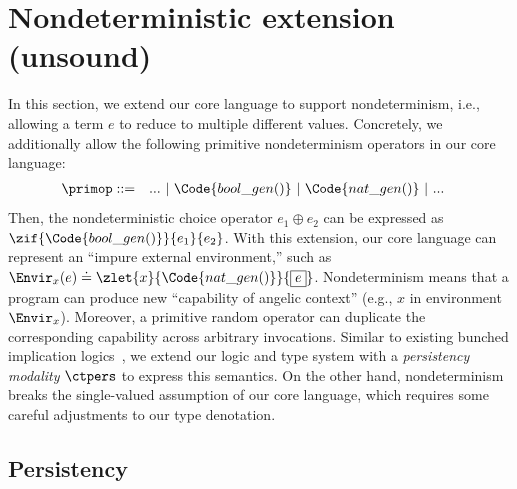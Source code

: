 \section{Nondeterministic extension (unsound)}\label{sec:extension}

In this section, we extend our core language to support nondeterminism, i.e., allowing a term $e$ to reduce to multiple different values. Concretely, we additionally allow the following primitive nondeterminism operators in our core language:
\begin{align*}
  \primop ::= \quad & ... ~|~ \Code{bool\_gen()} ~|~ \Code{nat\_gen()} ~|~ ...
\end{align*}\noindent
Then, the nondeterministic choice operator $e_1 \oplus e_2$ can be expressed as $\zif{\Code{bool\_gen()}}{e_1}{e_2}$.
With this extension, our core language can represent an ``impure external environment,'' such as $\Envir_x(e) \doteq \zlet{x}{\Code{nat\_gen()}}{\boxed{e}}$. Nondeterminism means that a program can produce new ``capability of angelic context'' (e.g., $x$ in environment $\Envir_x$). Moreover, a primitive random operator can duplicate the corresponding capability across arbitrary invocations. Similar to existing bunched implication logics~\cite{Iris}, we extend our logic and type system with a \emph{persistency modality} $\ctpers$ to express this semantics. On the other hand, nondeterminism breaks the single-valued assumption of our core language, which requires some careful adjustments to our type denotation.

\subsection{Persistency}

